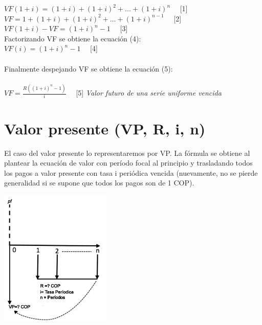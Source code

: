 $VF(1+i)= (1+i)+(1+i)^{2}+...+(1+i)^{n}$ \ \ [1]
	\\
$VF=1+(1+i)+(1+i)^{2}+...+(1+i)^{n-1}$ \ \ [2]\\
$VF (1+i) - VF = (1+i)^{n} -1$ \ \ [3]\\

	Factorizando VF se obtiene la ecuación (4):\\

$VF(i)=(1+i)^{n}-1$ \ \ [4]\\ \\
	Finalmente despejando VF se obtiene la ecuación (5):\\
	\\
$VF = \frac {R((1+i)^n-1)}{i}$ \ \ [5] \hspace{35pt} \textit{Valor futuro de una serie uniforme vencida} \\

	\section{Valor presente (VP, R, i, n)}

	El caso del valor presente lo representaremos por VP. La fórmula se obtiene al plantear la ecuación de valor con período focal al principio y trasladando todos los pagos a valor presente con tasa i periódica vencida (nuevamente, no se pierde generalidad si se supone que todos los pagos son de 1 COP).

	\begin{center}
		\includegraphics[height=6.5cm]{4_Capitulo/img/ejemplos/4_8.pdf}
	\end{center}

